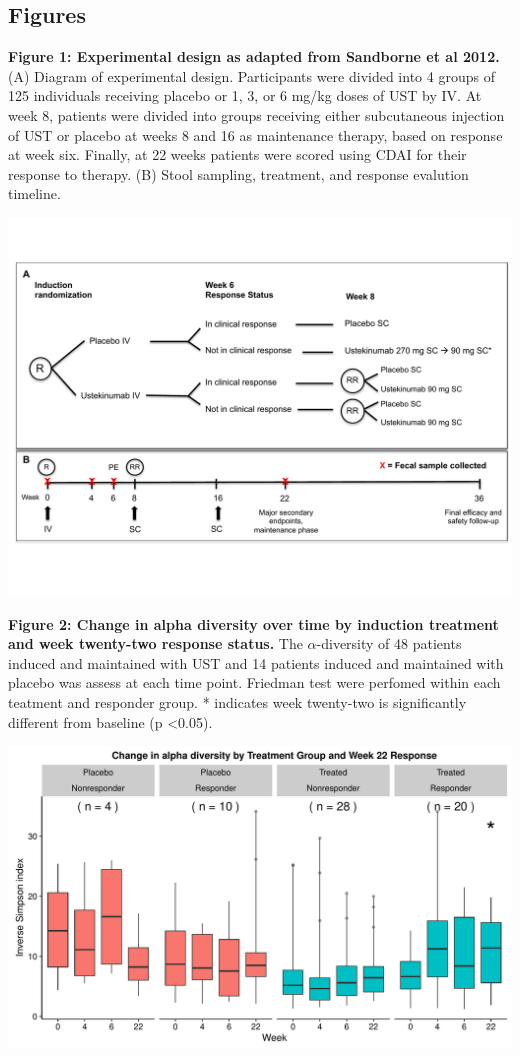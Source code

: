 \documentclass[11pt,]{article}
\begin{document}
\newpage

\subsection{Figures}\label{figures}

\textbf{Figure 1: Experimental design as adapted from Sandborne et al
2012.} (A) Diagram of experimental design. Participants were divided
into 4 groups of 125 individuals receiving placebo or 1, 3, or 6 mg/kg
doses of UST by IV. At week 8, patients were divided into groups
receiving either subcutaneous injection of UST or placebo at weeks 8 and
16 as maintenance therapy, based on response at week six. Finally, at 22
weeks patients were scored using CDAI for their response to therapy. (B)
Stool sampling, treatment, and response evalution timeline.

\includegraphics{figures/Figure1_expdesign.pdf}

\newpage

\textbf{Figure 2: Change in alpha diversity over time by induction
treatment and week twenty-two response status.} The
\({\alpha}\)-diversity of 48 patients induced and maintained with UST
and 14 patients induced and maintained with placebo was assess at each
time point. Friedman test were perfomed within each teatment and
responder group. * indicates week twenty-two is significantly different
from baseline (p \textless{}0.05).

\includegraphics{figures/Figure2_alltp.adivXvisitXindtrtXrelRSPwk22.pdf}
\end{document}
